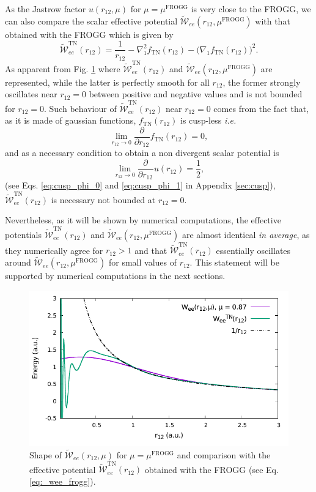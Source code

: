\documentclass[aip,jcp,reprint,noshowkeys,superscriptaddress]{revtex4-1}
\newcommand{\deriv}[3]{\frac{\partial^{#3} #1}{\partial {#2}^{#3}}}
\newcommand{\mfrogg}[0]{\mu^\text{FROGG}}
\begin{document}
As the Jastrow factor $u(r_{12},\mu)$ for $\mu=\mfrogg$ is very close to the FROGG, we can also compare the scalar effective potential $\tilde{\mathcal{W}}_{ee}(r_{12},\mfrogg)$ with that obtained with the FROGG which is given by
\begin{equation}
 \label{eq:_wee_frogg}
 \tilde{\mathcal{W}}_{ee}^\text{TN}(r_{12})= \frac{1}{r_{12}}-\nabla_1^2 f_{\text{TN}}(r_{12}) - \big(\nabla_1 f_{\text{TN}}(r_{12}) \big) ^2. 
\end{equation}
As apparent from Fig. \ref{fig_wee_frogg} where $\tilde{\mathcal{W}}_{ee}^\text{TN}(r_{12})$ and $\tilde{\mathcal{W}}_{ee}(r_{12},\mfrogg)$ are represented, while the latter is perfectly smooth for all $r_{12}$, the former strongly oscillates near $r_{12}=0$ between positive and negative values and is not bounded for $r_{12}=0$. 
Such behaviour of $\tilde{\mathcal{W}}_{ee}^\text{TN}(r_{12})$ near $r_{12}=0$ comes from the fact that,
as it is made of gaussian functions, $f_{\text{TN}}(r_{12})$ is cusp-less \textit{i.e.} 
\begin{equation}
 \lim_{r_{12}\rightarrow 0} \deriv{}{r_{12}}{}f_{\text{TN}}(r_{12}) = 0, 
\end{equation}
and as a necessary condition to obtain a non divergent scalar potential is 
\begin{equation}
 \label{eq:cusp_phi_0}
 \lim_{r_{12}\rightarrow 0} \deriv{}{r_{12}}{}u(r_{12}) = \frac{1}{2}, 
\end{equation}
(see Eqs. \eqref{eq:cusp_phi_0}  and \eqref{eq:cusp_phi_1} in Appendix \ref{sec:cusp}), $\tilde{\mathcal{W}}_{ee}^\text{TN}(r_{12})$ is necessary not bounded at $r_{12}=0$.  

Nevertheless, as it will be shown by numerical computations, the effective potentials $\tilde{\mathcal{W}}_{ee}^\text{TN}(r_{12})$ and $\tilde{\mathcal{W}}_{ee}(r_{12},\mfrogg)$ are almost identical \textit{in average}, as they numerically agree for $r_{12}>1$ and that $\tilde{\mathcal{W}}_{ee}^\text{TN}(r_{12})$ essentially oscillates around $\tilde{\mathcal{W}}_{ee}(r_{12},\mfrogg)$ for small values of $r_{12}$. This statement will be supported by numerical computations in the next sections. 

\begin{figure}
 \label{fig_wee_frogg}
        \includegraphics[width=0.45\linewidth]{plots/jastrow/w_ee_frog.pdf}
        \caption{Shape of $\tilde{\mathcal{W}}_{ee}(r_{12},\mu)$ for $\mu=\mfrogg$ and comparison with the effective potential $\tilde{\mathcal{W}}_{ee}^\text{TN}(r_{12})$ obtained with the FROGG (see Eq.\eqref{eq:_wee_frogg}).}
\end{figure}
\end{document}
